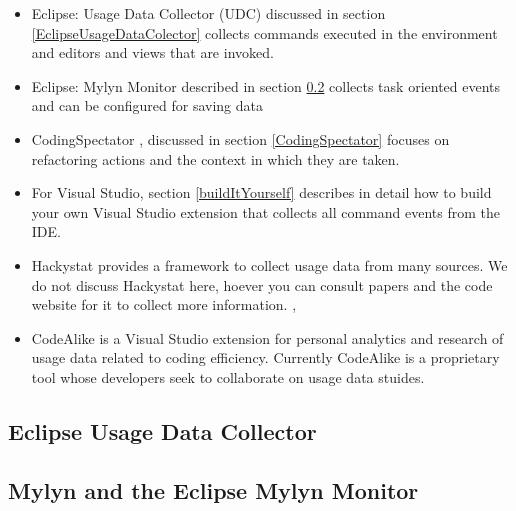 \begin{itemize}

	\item Eclipse: Usage Data Collector (UDC) discussed in section \ref{EclipseUsageDataColector} collects commands executed in the environment and editors and views that are invoked.
	
	\item Eclipse: Mylyn Monitor described in section \ref{MylynMonitor} collects task oriented events and can be configured for saving data
	
	\item CodingSpectator %
, discussed in section \ref{CodingSpectator} focuses on refactoring actions and the context in which they are taken.
	
	\item For Visual Studio, section \ref{buildItYourself} describes in detail how to build your own Visual Studio extension that collects all command events from the IDE.
	
	\item Hackystat provides a framework to collect usage data from many sources.  We do not discuss Hackystat here, hoever you can consult papers and the code website for it to collect more information. \cite{V:johnson2003beyond}, %
	
	\item CodeAlike is a Visual Studio extension for personal analytics and research of usage data related to coding efficiency.  Currently CodeAlike is a proprietary tool whose developers seek to collaborate on usage data stuides.

\end{itemize}


\subsection{Eclipse Usage Data Collector}
\label{EclipseUsageDataCollector}


\subsection{Mylyn and the Eclipse Mylyn Monitor} 
\label{MylynMonitor}


